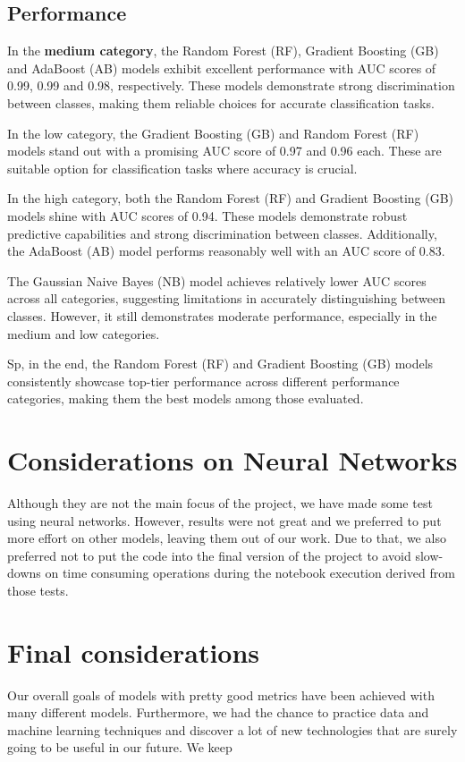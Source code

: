 \subsection{Performance}
In the \textbf{medium category}, the Random Forest (RF), Gradient Boosting (GB) and AdaBoost (AB) models exhibit excellent performance with AUC scores of 0.99, 0.99 and 0.98, respectively. These models demonstrate strong discrimination between classes, making them reliable choices for accurate classification tasks.

In the low category, the Gradient Boosting (GB) and Random Forest (RF) models stand out with a promising AUC score of 0.97 and 0.96 each. These are suitable option for classification tasks where accuracy is crucial.

In the high category, both the Random Forest (RF) and Gradient Boosting (GB) models shine with AUC scores of 0.94. These models demonstrate robust predictive capabilities and strong discrimination between classes. Additionally, the AdaBoost (AB) model performs reasonably well with an AUC score of 0.83.

The Gaussian Naive Bayes (NB) model achieves relatively lower AUC scores across all categories, suggesting limitations in accurately distinguishing between classes. However, it still demonstrates moderate performance, especially in the medium and low categories.

Sp, in the end, the Random Forest (RF) and Gradient Boosting (GB) models consistently showcase top-tier performance across different performance categories, making them the best models among those evaluated.

\section{Considerations on Neural Networks}
Although they are not the main focus of the project, we have made some test using neural networks. However, results were not great and we preferred to put more effort on other models, leaving them out of our work. Due to that, we also preferred not to put the code into the final version of the project to avoid slow-downs on time consuming operations during the notebook execution derived from those tests.
\section{Final considerations}
Our overall goals of models with pretty good metrics have been achieved with many different models. Furthermore, we had the chance to practice data and machine learning techniques and discover a lot of new technologies that are surely going to be useful in our future. We keep 